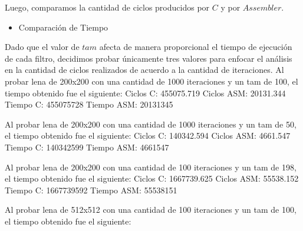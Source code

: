 \documentclass[10pt, a4paper]{article}
\begin{document}
\begin{itemize}
Luego, comparamos la cantidad de ciclos producidos por $C$ y por $Assembler$.\newline
\begin{itemize}
\item{Comparación de Tiempo}
\end{itemize}
Dado que el valor de $tam$ afecta de manera proporcional el tiempo de ejecución de cada filtro, decidimos probar únicamente tres valores para enfocar el análisis en la cantidad de ciclos realizados de acuerdo a la cantidad de iteraciones.\newline 
\newline
Al probar lena de 200x200 con una cantidad de 1000 iteraciones y un tam de 100, el tiempo obtenido fue el siguiente:\newline
Ciclos C:                 455075.719\newline
Ciclos ASM:               20131.344\newline
\newline
Tiempo C:                 455075728\newline
Tiempo ASM:               20131345\newline
\newline

Al probar lena de 200x200 con una cantidad de 1000 iteraciones y un tam de 50, el tiempo obtenido fue el siguiente:\newline
Ciclos C:                 140342.594\newline
Ciclos ASM:               4661.547\newline
\newline
Tiempo C:                 140342599\newline
Tiempo ASM:               4661547\newline

Al probar lena de 200x200 con una cantidad de 100 iteraciones y un tam de 198, el tiempo obtenido fue el siguiente:\newline
Ciclos C:                 1667739.625\newline
Ciclos ASM:               55538.152\newline
\newline
Tiempo C:                 1667739592\newline
Tiempo ASM:               55538151\newline
\newline


Al probar lena de 512x512 con una cantidad de 100 iteraciones y un tam de 100, el tiempo obtenido fue el siguiente:\newline


\end{itemize}
\end{document}
